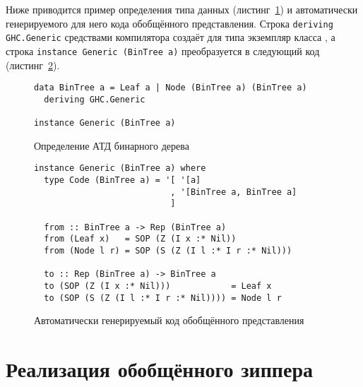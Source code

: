 Ниже приводится пример определения типа данных (листинг~\ref{list:bin-tree}) и автоматически генерируемого для него кода обобщённого представления. Строка \lstinline{deriving GHC.Generic} средствами компилятора создаёт для типа экземпляр класса , а строка \lstinline{instance Generic (BinTree a)} преобразуется в следующий код (листинг~\ref{list:generic-bin-tree}).
\begin{figure}[h]
\begin{framed}
\vspace{-0.25cm}
\begin{lstlisting}
data BinTree a = Leaf a | Node (BinTree a) (BinTree a)
  deriving GHC.Generic

instance Generic (BinTree a)
\end{lstlisting}
\vspace{-0.25cm}
\end{framed}
\caption{Определение АТД бинарного дерева}
\label{list:bin-tree}
\end{figure}

\begin{figure}[h]
\begin{framed}
\vspace{-0.25cm}
\begin{lstlisting}
instance Generic (BinTree a) where
  type Code (BinTree a) = '[ '[a]
                           , '[BinTree a, BinTree a]
                           ]
                           
  from :: BinTree a -> Rep (BinTree a)
  from (Leaf x)   = SOP (Z (I x :* Nil))
  from (Node l r) = SOP (S (Z (I l :* I r :* Nil)))
  
  to :: Rep (BinTree a) -> BinTree a
  to (SOP (Z (I x :* Nil)))            = Leaf x
  to (SOP (S (Z (I l :* I r :* Nil)))) = Node l r
\end{lstlisting}
\vspace{-0.25cm}
\end{framed}
\caption{Автоматически генерируемый код обобщённого представления}
\label{list:generic-bin-tree}
\end{figure}

\section{Реализация обобщённого зиппера}
\label{sec:generic-zippers-sop}

\printbibliography[heading=bibintoc%
]

